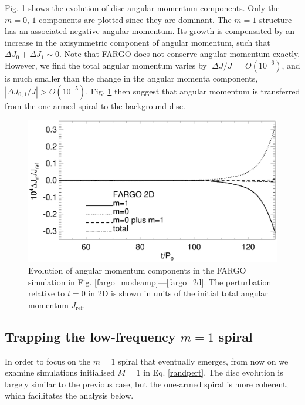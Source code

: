 Fig. \ref{2d_angmom} shows the evolution of disc angular momentum
components. Only the $m=0,\,1$ components are 
plotted since they are dominant. The $m=1$ structure has
an associated negative angular momentum.  
Its growth is compensated by an increase in the axisymmetric
component of angular momentum, such that $\Delta J_0 + \Delta
J_1 \sim 0$. Note that FARGO does not conserve angular momentum
exactly. However, we find the total angular momentum varies by 
$|\Delta J/J|= O(10^{-6})$, and is much smaller than the
change in the angular momenta components, $|\Delta J_{0,1}/J|>
O(10^{-5})$. Fig. \ref{2d_angmom} then suggest that angular momentum
is transferred from the one-armed spiral to the background disc.    

\begin{figure}
  \includegraphics[width=\linewidth]{figures/nonaxi_evol_ang_fargo}
  \caption{Evolution of angular momentum components in the 
    FARGO simulation in Fig. \ref{fargo_modeamp}---\ref{fargo_2d}. The
    perturbation relative to $t=0$ in 2D is shown in units of the 
    initial total angular momentum $J_\mathrm{ref}$.\label{2d_angmom}} 
\end{figure}   

\subsection{Trapping the low-frequency $m=1$ spiral}\label{fargo_m1}
In order to focus on the $m=1$ spiral that eventually emerges, from
now on we examine simulations initialised 
$M=1$ in Eq. \ref{randpert}. The disc 
evolution is largely similar to the previous case, but the one-armed spiral is
more coherent, which facilitates the analysis below. 

